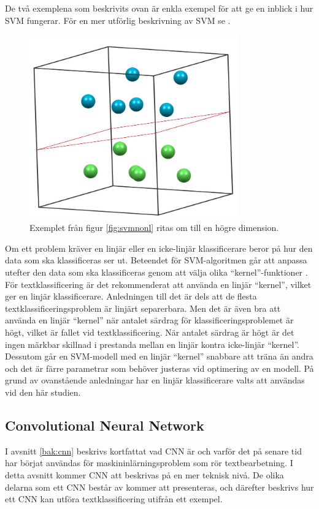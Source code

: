 \documentclass{kaumasters} %
\begin{document}
De två exemplena som beskrivits ovan är enkla exempel för att ge en inblick i hur SVM fungerar. För en mer utförlig beskrivning av SVM se \cite{svm:002}.

\begin{figure}[H]
\includegraphics[width=9cm]{svm_3d}
\centering
\caption{Exemplet från figur \ref{fig:svmnonl} ritas om till en högre dimension.}
\label{fig:svm3d}
\end{figure}

Om ett problem kräver en linjär eller en icke-linjär klassificerare beror på hur den data som ska klassificeras ser ut. Beteendet för SVM-algoritmen går att anpassa utefter den data som ska klassificeras genom att välja olika “kernel”-funktioner \cite{svm:006}. För textklassificering är det rekommenderat att använda en linjär “kernel”, vilket ger en linjär klassificerare. Anledningen till det är dels att de flesta textklassificeringsproblem är linjärt separerbara. Men det är även bra att använda en linjär “kernel” när antalet särdrag för klassificeringsproblemet är högt, vilket är fallet vid textklassificering. När antalet särdrag är högt är det ingen märkbar skillnad i prestanda mellan en linjär kontra icke-linjär “kernel”. Dessutom går en SVM-modell med en linjär “kernel” snabbare att träna än andra och det är färre parametrar som behöver justeras vid optimering av en modell.
På grund av ovanstående anledningar har en linjär klassificerare valts att användas vid den här studien.



\subsection{Convolutional Neural Network} \label{exp:cnn}
I avsnitt \ref{bak:cnn} beskrivs kortfattat vad CNN är och varför det på senare tid har börjat användas för maskininlärningsproblem som rör textbearbetning. I detta avsnitt kommer CNN att beskrivas på en mer teknisk nivå. De olika delarna som ett CNN består av kommer att presenteras, och därefter beskrivs hur ett CNN kan utföra textklassificering utifrån ett exempel. 
\end{document}
